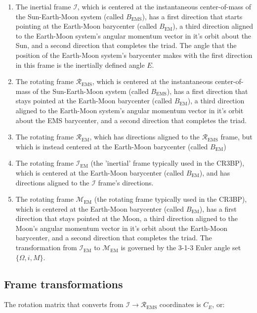 \documentclass[]{article}
\begin{document}
	\begin{enumerate}
		\item The inertial frame $\mathcal{I}$, which is centered at the instantaneous center-of-mass of the Sun-Earth-Moon system (called $B_\text{EMS}$), has a first direction that starts pointing at the Earth-Moon barycenter (called $B_\text{EM}$), a third direction aligned to the Earth-Moon system's angular momentum vector in it's orbit about the Sun, and a second direction that completes the triad.  The angle that the position of the Earth-Moon system's barycenter makes with the first direction in this frame is the inertially defined angle $E$.
		\item The rotating frame $\mathcal{R}_\text{EMS}$, which is centered at the instantaneous center-of-mass of the Sun-Earth-Moon system (called $B_\text{EMS}$), has a first direction that stays pointed at the Earth-Moon barycenter (called $B_\text{EM}$), a third direction aligned to the Earth-Moon system's angular momentum vector in it's orbit about the EMS barycenter, and a second direction that completes the triad.
		\item The rotating frame $\mathcal{R}_\text{EM}$, which has directions aligned to the $\mathcal{R}_\text{EMS}$ frame, but which is instead centered at the Earth-Moon barycenter (called $B_\text{EM}$)
		\item The rotating frame $\mathcal{I}_\text{EM}$ (the 'inertial' frame typically used in the CR3BP), which is centered at the Earth-Moon barycenter (called $B_\text{EM}$), and has directions aligned to the $\mathcal{I}$ frame's directions.
		\item The rotating frame $\mathcal{M}_\text{EM}$ (the rotating frame typically used in the CR3BP), which is centered at the Earth-Moon barycenter (called $B_\text{EM}$), has a first direction that stays pointed at the Moon, a third direction aligned to the Moon's angular momentum vector in it's orbit about the Earth-Moon barycenter, and a second direction that completes the triad.  The transformation from $\mathcal{I}_\text{EM}$ to $\mathcal{M}_\text{EM}$ is governed by the 3-1-3 Euler angle set $\{\Omega, i, M\}$.
	\end{enumerate}
	
	\subsection{Frame transformations}
	
	The rotation matrix that converts from $\mathcal{I}\rightarrow\mathcal{R}_\text{EMS}$ coordinates is $C_E$, or:
	
\end{document}
